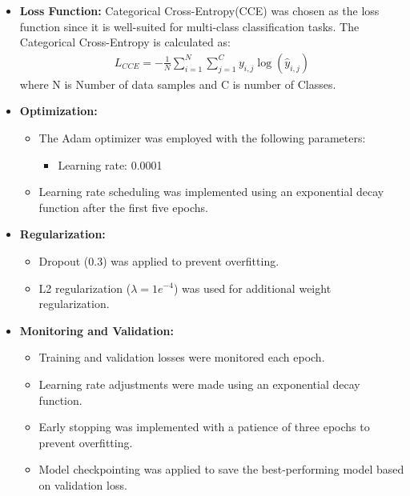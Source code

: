 \begin{itemize}
\begin{itemize}
                  \item \textbf{Loss Function:}
                  Categorical Cross-Entropy(CCE) was chosen as the loss function since it is well-suited for multi-class classification tasks. The Categorical Cross-Entropy is calculated as:
                  \begin{eqnarray}
                        L_{CCE} = -\frac{1}{N} \sum_{i=1}^{N} \sum_{j=1}^{C} y_{i,j} \log(\hat{y}_{i,j})
                  \end{eqnarray}
                        where N is Number of data samples and C is number of Classes.
                  
      
            
                  \item \textbf{Optimization:}
                  \begin{itemize}
                  \item The Adam optimizer was employed with the following parameters:
                  \begin{itemize}
                        \item Learning rate: 0.0001
                  \end{itemize}
                  \item Learning rate scheduling was implemented using an exponential decay function after the first five epochs.
                  \end{itemize}
            
                  \item \textbf{Regularization:}
                  \begin{itemize}
                  \item Dropout (0.3) was applied to prevent overfitting.
                  \item L2 regularization (\(\lambda = 1e^{-4}\)) was used for additional weight regularization.
                  \end{itemize}
            
                  \item \textbf{Monitoring and Validation:}
                  \begin{itemize}
                  \item Training and validation losses were monitored each epoch.
                  \item Learning rate adjustments were made using an exponential decay function.
                  \item Early stopping was implemented with a patience of three epochs to prevent overfitting.
                  \item Model checkpointing was applied to save the best-performing model based on validation loss.
                  \end{itemize}
            \end{itemize} 
            

\end{itemize}
